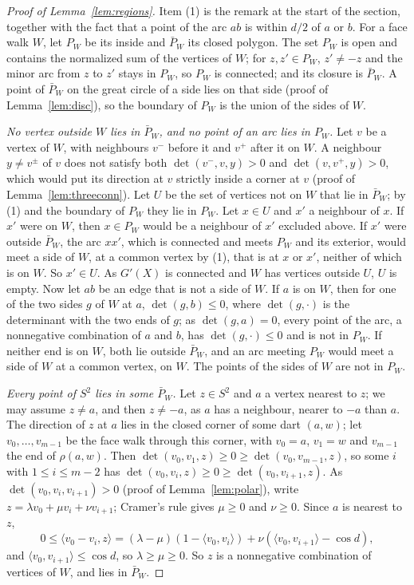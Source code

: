 \documentclass[12pt]{amsart}
\theoremstyle{definition}
\theoremstyle{plain}
\theoremstyle{definition}
\newcommand{\Sph}{S^2}
\begin{document}
\begin{proof}[Proof of Lemma~\ref{lem:regions}]
Item (1) is the remark at the start of the section, together with the fact that a point of the arc $ab$ is within $d/2$ of $a$ or $b$. For a face walk $W$, let $P_W$ be its inside and $\bar P_W$ its closed polygon. The set $P_W$ is open and contains the normalized sum of the vertices of $W$; for $z,z'\in P_W$, $z'\ne-z$ and the minor arc from $z$ to $z'$ stays in $P_W$, so $P_W$ is connected; and its closure is $\bar P_W$. A point of $\bar P_W$ on the great circle of a side lies on that side (proof of Lemma~\ref{lem:disc}), so the boundary of $P_W$ is the union of the sides of $W$.

\emph{No vertex outside $W$ lies in $\bar P_W$, and no point of an arc lies in $P_W$.} Let $v$ be a vertex of $W$, with neighbours $v^-$ before it and $v^+$ after it on $W$. A neighbour $y\ne v^\pm$ of $v$ does not satisfy both $\det(v^-,v,y)>0$ and $\det(v,v^+,y)>0$, which would put its direction at $v$ strictly inside a corner at $v$ (proof of Lemma~\ref{lem:threeconn}). Let $U$ be the set of vertices not on $W$ that lie in $\bar P_W$; by (1) and the boundary of $P_W$ they lie in $P_W$. Let $x\in U$ and $x'$ a neighbour of $x$. If $x'$ were on $W$, then $x\in P_W$ would be a neighbour of $x'$ excluded above. If $x'$ were outside $\bar P_W$, the arc $xx'$, which is connected and meets $P_W$ and its exterior, would meet a side of $W$, at a common vertex by (1), that is at $x$ or $x'$, neither of which is on $W$. So $x'\in U$. As $G'(X)$ is connected and $W$ has vertices outside $U$, $U$ is empty. Now let $ab$ be an edge that is not a side of $W$. If $a$ is on $W$, then for one of the two sides $g$ of $W$ at $a$, $\det(g,b)\le0$, where $\det(g,\cdot)$ is the determinant with the two ends of $g$; as $\det(g,a)=0$, every point of the arc, a nonnegative combination of $a$ and $b$, has $\det(g,\cdot)\le0$ and is not in $P_W$. If neither end is on $W$, both lie outside $\bar P_W$, and an arc meeting $P_W$ would meet a side of $W$ at a common vertex, on $W$. The points of the sides of $W$ are not in $P_W$.

\emph{Every point of $\Sph$ lies in some $\bar P_W$.} Let $z\in\Sph$ and $a$ a vertex nearest to $z$; we may assume $z\ne a$, and then $z\ne-a$, as $a$ has a neighbour, nearer to $-a$ than $a$. The direction of $z$ at $a$ lies in the closed corner of some dart $(a,w)$; let $v_0,\dots,v_{m-1}$ be the face walk through this corner, with $v_0=a$, $v_1=w$ and $v_{m-1}$ the end of $\rho(a,w)$. Then $\det(v_0,v_1,z)\ge0\ge\det(v_0,v_{m-1},z)$, so some $i$ with $1\le i\le m-2$ has $\det(v_0,v_i,z)\ge0\ge\det(v_0,v_{i+1},z)$. As $\det(v_0,v_i,v_{i+1})>0$ (proof of Lemma~\ref{lem:polar}), write $z=\lambda v_0+\mu v_i+\nu v_{i+1}$; Cramer's rule gives $\mu\ge0$ and $\nu\ge0$. Since $a$ is nearest to $z$,
\[
0\le\langle v_0-v_i,z\rangle=(\lambda-\mu)(1-\langle v_0,v_i\rangle)+\nu(\langle v_0,v_{i+1}\rangle-\cos d),
\]
and $\langle v_0,v_{i+1}\rangle\le\cos d$, so $\lambda\ge\mu\ge0$. So $z$ is a nonnegative combination of vertices of $W$, and lies in $\bar P_W$.


\end{proof}
\end{document}
